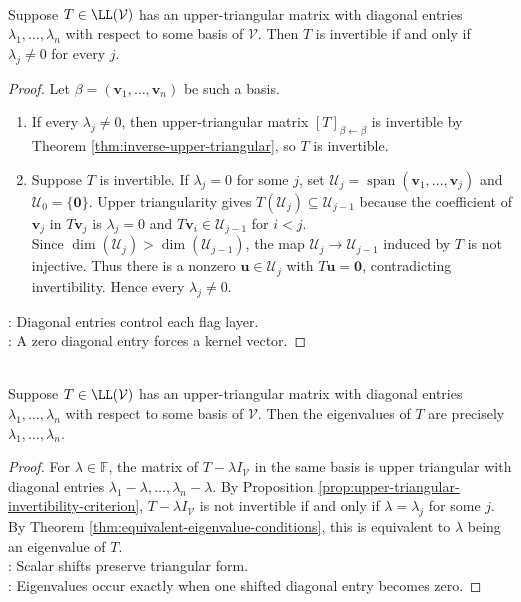 \begin{proposition} \label{prop:upper-triangular-invertibility-criterion} \\
Suppose $T\in\LL(\mathcal{V})$ has an upper-triangular matrix with diagonal entries $\lambda_1,\ldots,\lambda_n$ with respect to some basis of $\mathcal{V}$. Then $T$ is invertible if and only if $\lambda_j\neq0$ for every $j$.
\begin{proof}
Let $\beta=(\mathbf{v}_1,\ldots,\mathbf{v}_n)$ be such a basis.
\begin{enumerate}[label=\roman*.]
\setlength{\itemsep}{0pt}
\item[$(\Leftarrow)$]
If every $\lambda_j\neq0$, then upper-triangular matrix $[T]_{\beta\leftarrow\beta}$ is invertible by Theorem \ref{thm:inverse-upper-triangular}, so $T$ is invertible.
\item[$(\Rightarrow)$]
Suppose $T$ is invertible. If $\lambda_j=0$ for some $j$, set $\mathcal{U}_j=\operatorname{span}(\mathbf{v}_1,\ldots,\mathbf{v}_j)$ and $\mathcal{U}_0=\{\mathbf{0}\}$. Upper triangularity gives $T(\mathcal{U}_j)\subseteq\mathcal{U}_{j-1}$ because the coefficient of $\mathbf{v}_j$ in $T\mathbf{v}_j$ is $\lambda_j=0$ and $T\mathbf{v}_i\in\mathcal{U}_{j-1}$ for $i<j$.\\
Since $\dim(\mathcal{U}_j)>\dim(\mathcal{U}_{j-1})$, the map $\mathcal{U}_j\to\mathcal{U}_{j-1}$ induced by $T$ is not injective. Thus there is a nonzero $\mathbf{u}\in\mathcal{U}_j$ with $T\mathbf{u}=\mathbf{0}$, contradicting invertibility. Hence every $\lambda_j\neq0$.
\end{enumerate}
: Diagonal entries control each flag layer.\\
: A zero diagonal entry forces a kernel vector.
\end{proof}
\end{proposition}

\begin{proposition} \label{prop:eigenvalues-of-upper-triangular-operator} \\
Suppose $T\in\LL(\mathcal{V})$ has an upper-triangular matrix with diagonal entries $\lambda_1,\ldots,\lambda_n$ with respect to some basis of $\mathcal{V}$. Then the eigenvalues of $T$ are precisely $\lambda_1,\ldots,\lambda_n$.
\begin{proof}
For $\lambda\in\mathbb{F}$, the matrix of $T-\lambda I_{\mathcal{V}}$ in the same basis is upper triangular with diagonal entries $\lambda_1-\lambda,\ldots,\lambda_n-\lambda$. By Proposition \ref{prop:upper-triangular-invertibility-criterion}, $T-\lambda I_{\mathcal{V}}$ is not invertible if and only if $\lambda=\lambda_j$ for some $j$. By Theorem \ref{thm:equivalent-eigenvalue-conditions}, this is equivalent to $\lambda$ being an eigenvalue of $T$.\\
: Scalar shifts preserve triangular form.\\
: Eigenvalues occur exactly when one shifted diagonal entry becomes zero.
\end{proof}
\end{proposition}

